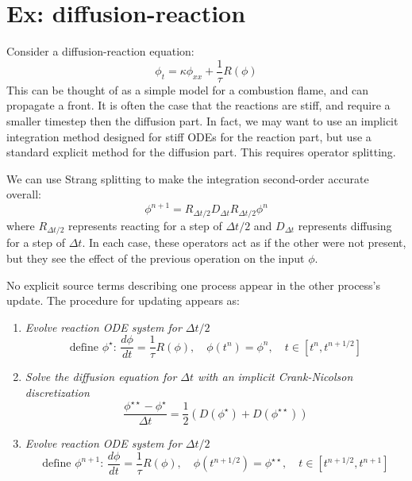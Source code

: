 \section{Ex: diffusion-reaction}

Consider a diffusion-reaction equation:
\begin{equation}
\phi_t = \kappa \phi_{xx} + \frac{1}{\tau} R(\phi)
\end{equation}
This can be thought of as a simple model for a combustion flame, and
can propagate a front.  It is often the case that the reactions are
stiff, and require a smaller timestep then the diffusion part.  In
fact, we may want to use an implicit integration method designed for
stiff ODEs for the reaction part, but use a standard explicit method
for the diffusion part.  This requires operator splitting.

We can use Strang splitting \cite{strang} to make the integration
second-order accurate overall:
\begin{equation}
\phi^{n+1} = R_{\Delta t/2} D_{\Delta t} R_{\Delta t/2} \phi^n
\end{equation}
where $R_{\Delta t/2}$ represents reacting for a step of $\Delta t/2$
and $D_{\Delta t}$ represents diffusing for a step of $\Delta t$.  In
each case, these operators act as if the other were not present, but
they see the effect of the previous operation on the input $\phi$.  

No explicit source terms describing one process appear in the other
process's update.  The procedure for updating appears as:
\begin{enumerate}
\item {\em Evolve reaction ODE system for $\Delta t/2$}
   \begin{equation}
     \text{define } \phi^\star: \, \frac{d\phi}{dt} = \frac{1}{\tau} R(\phi), \quad 
   \phi(t^n) = \phi^n, \quad t \in [t^n, t^{n+1/2}]
   \end{equation}

\item {\em Solve the diffusion equation for $\Delta t$ with an
           implicit Crank-Nicolson discretization}
   \begin{equation}
     \frac{\phi^{\star\star} - \phi^\star}{\Delta t} =
      \frac{1}{2} (D(\phi^\star) + D(\phi^{\star\star}))
   \end{equation}

\item {\em Evolve reaction ODE system for $\Delta t/2$}
   \begin{equation}
     \text{define } \phi^{n+1}: \, \frac{d\phi}{dt} = \frac{1}{\tau} R(\phi), \quad 
   \phi(t^{n+1/2}) = \phi^{\star\star}, \quad t \in [t^{n+1/2}, t^{n+1}]
   \end{equation}

\end{enumerate}

